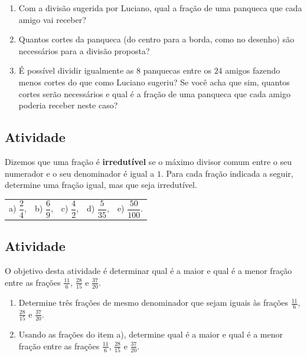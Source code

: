 \begin{enumerate} [\quad a)] %
  \item     Com a divisão sugerida por Luciano, qual a fração de uma panqueca que cada amigo vai receber?
  \item     Quantos cortes da panqueca (do centro para a borda, como no desenho) são necessários para a divisão proposta?
  \item     É possível dividir igualmente as     $8$ panquecas entre os     $24$ amigos fazendo menos cortes do que como Luciano sugeriu? Se você acha que sim, quantos cortes serão necessários e qual é a fração de uma panqueca que cada amigo poderia receber neste caso?
\end{enumerate} %

\subsection{Atividade}

Dizemos que uma fração é {\bf irredutível} se o máximo divisor comum entre o seu numerador e o seu denominador é igual a $1$. Para cada fração indicada a seguir, determine uma fração igual, mas que seja irredutível.
\vspace{.2cm}

\begin{tabular}{m{}m{}m{}m{}m{}}
a) $\dfrac{2}{4}$, & b) $\dfrac{6}{9}$, & c) $\dfrac{4}{2}$, & d) $\dfrac{5}{35}$, & e) $\dfrac{50}{100}$.
\end{tabular}

\subsection{Atividade}

O objetivo desta atividade é determinar qual é a maior e qual é a menor fração entre
as frações $\frac{11}{6}$, $\frac{28}{15}$ e $\frac{37}{20}$.

\begin{enumerate} [\quad a)] %
  \item     Determine três frações de mesmo denominador que sejam iguais às frações     $\frac{11}{6}$,     $\frac{28}{15}$ e     $\frac{37}{20}$.
  \item     Usando as frações do item a), determine qual é a maior e qual é a menor fração entre as frações     $\frac{11}{6}$,     $\frac{28}{15}$ e     $\frac{37}{20}$.
\end{enumerate} %

